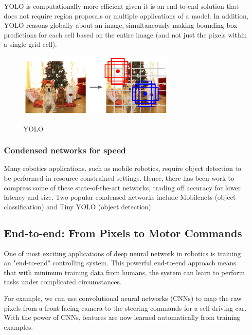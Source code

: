 \documentclass[twoside]{article}
\begin{document}
YOLO is computationally more efficient given it is an end-to-end solution that does not require region proposals or multiple applications of a model. In addition, YOLO reasons globally about an image, simultaneously making bounding box predictions for each cell based on the entire image (and not just the pixels within a single grid cell).

\begin{figure}[h!]
\centering
{\includegraphics[width=0.70\textwidth]{img/YOLO.png}}
\caption{YOLO}
\label{fig:yolo}
\end{figure}

\subsubsection{Condensed networks for speed}

Many robotics applications, such as mobile robotics, require object detection to be performed in resource constrained settings. Hence, there has been work to compress some of these state-of-the-art networks, trading off accuracy for lower latency and size. Two popular condensed networks include Mobilenets \cite{howard2017mobilenets} (object classification) and Tiny YOLO (object detection).

\subsection{End-to-end: From Pixels to Motor Commands}

One of most exciting applications of deep neural network in robotics is training an "end-to-end" controlling system. This powerful end-to-end approach means that with minimum training data from humans, the system can learn to perform tasks under complicated circumstances.

For example, we can use convolutional neural networks (CNNs) to map the raw pixels from a front-facing camera to the steering commands for a self-driving car. With the power of CNNs,  features are now learned  automatically from training examples. 
\end{document}
